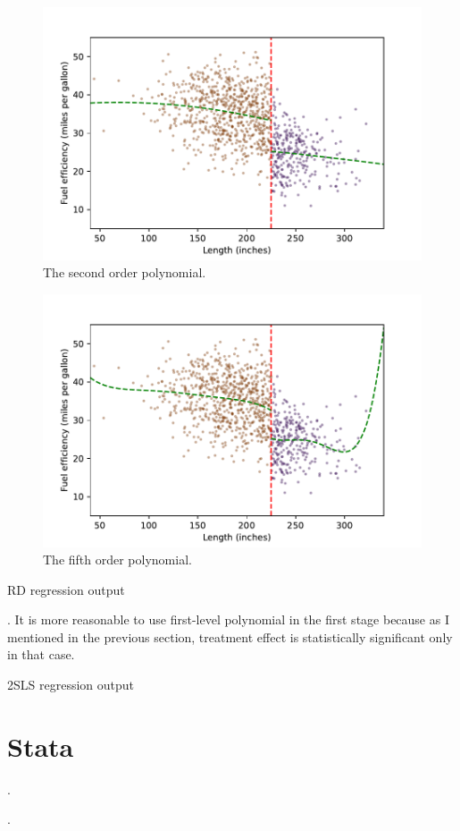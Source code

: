 \documentclass{article}
\begin{document}
\begin{figure}[h!]
    \centering
    \includegraphics{homework 7/output/figure/scatterplot3.pdf}
    \caption{The second order polynomial.}
    \label{fig:scatterplot3}
\end{figure}


\begin{figure}[h!]
    \centering
    \includegraphics{homework 7/output/figure/scatterplot5.pdf}
    \caption{The fifth order polynomial.}
    \label{fig:scatterplot5}
\end{figure}



\begin{table}[h]
    \centering
    
    \caption{RD regression output}
    \label{tab:RD}
\end{table}
\clearpage

. It is more reasonable to use first-level polynomial in the first stage because as I mentioned in the previous section, treatment effect is statistically significant only in that case. 
\begin{table}[h]
    \centering
    
    \caption{2SLS regression output}
    \label{tab:2SLSRD}
\end{table}

\section{Stata}

.


. 
\end{document}
